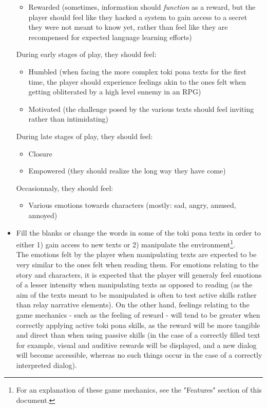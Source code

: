 \documentclass{scrartcl}
\begin{document}
\begin{itemize}
\begin{itemize}
					\item Rewarded (sometimes, information should \textit{function} as a reward, but the player should feel like they hacked a system to gain access to a secret they were not meant to know yet, rather than feel like they are recompensed for expected language learning efforts)
				\end{itemize}
				During early stages of play, they should feel: 
				\begin{itemize}
					\item Humbled (when facing the more complex toki pona texts for the first time, the player should experience feelings akin to the ones felt when getting obliterated by a high level ennemy in an RPG)
					\item Motivated (the challenge posed by the various texts should feel inviting rather than intimidating)
				\end{itemize}
				During late stages of play, they should feel:
				\begin{itemize}
					\item Closure
					\item Empowered (they should realize the long way they have come)
				\end{itemize}
				Occasionnaly, they should feel:
				\begin{itemize}
					\item Various emotions towards characters (mostly: sad, angry, amused, annoyed)
				\end{itemize}
				\item Fill the blanks or change the words in some of the toki pona texts in order to either 1) gain access to new texts or 2) manipulate the environment\footnote{For an explanation of these game mechanics, see the "Features" section of this document.}.\\
				The emotions felt by the player when manipulating texts are expected to be very similar to the ones felt when reading them. For emotions relating to the story and characters, it is expected that the player will generaly feel emotions of a lesser intensity when manipulating texts as opposed to reading (as the aim of the texts meant to be manipulated is often to test active skills rather than relay narrative elements). On the other hand, feelings relating to the game mechanics - such as the feeling of reward - will tend to be greater when correctly applying active toki pona skills, as the reward will be more tangible and direct than when using passive skills (in the case of a correctly filled text for example, visual and auditive rewards will be displayed, and a new dialog will become accessible, whereas no such things occur in the case of a correctly interpreted dialog).
			\end{itemize}
\end{document}
